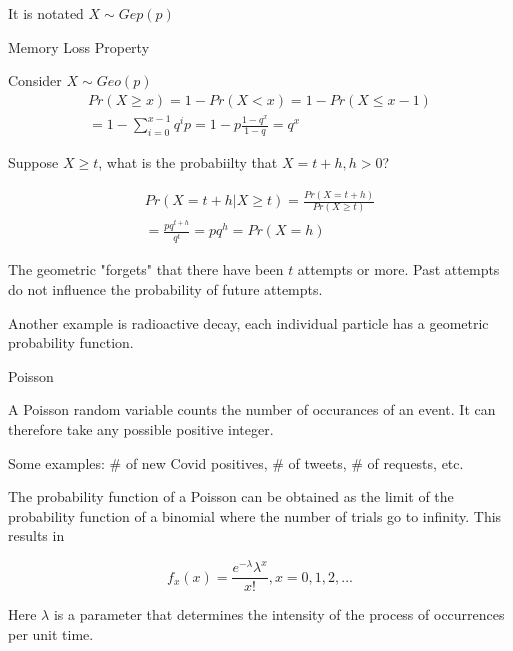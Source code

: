 \documentclass{report}
\begin{document}
\begin{description}
\begin{mdframed}
            It is notated $X \sim Gep(p)$
        \end{mdframed}
        \pagebreak
    \item {\large Memory Loss Property}
        \begin{mdframed}
            Consider $X \sim Geo(p)$
            \begin{gather}
               Pr(X \ge x) = 1 - Pr(X < x) = 1 - Pr(X \le x - 1)\\
               = 1 - \sum_{i=0}^{x-1}q^ip = 1 - p \frac{1-q^x}{1-q}
               = q^x
            \end{gather}

            Suppose $X \ge t$, what is the probabiilty that
            $X = t + h, h > 0$?

            \begin{gather}
                Pr(X=t+h | X \ge t) = \frac{Pr(X=t+h)}{Pr(X\ge t)}\\
                = \frac{pq^{t+h}}{q^t} = pq^h = Pr(X=h)
            \end{gather}

            The geometric "forgets" that there have been $t$ attempts
            or more. Past attempts do not influence the probability
            of future attempts.

            Another example is radioactive decay, each individual
            particle has a geometric probability function.
        \end{mdframed}
    \item {\large Poisson}
        \begin{mdframed}
            A Poisson random variable counts the number of occurances
            of an event. It can therefore take any possible positive
            integer.

            Some examples: \# of new Covid positives, \# of tweets,
             \# of requests, etc.

            The probability function of a Poisson can be obtained
            as the limit of the probability function of a binomial
            where the number of trials go to infinity. This results
            in

            \begin{displaymath}
                f_x(x) = \frac{e^{-\lambda} \lambda^x}{x!}, x = 0,1,2, ...
            \end{displaymath}

            Here $\lambda$ is a parameter that determines the intensity
            of the process of occurrences per unit time.


\end{mdframed}
\end{description}
\end{document}
